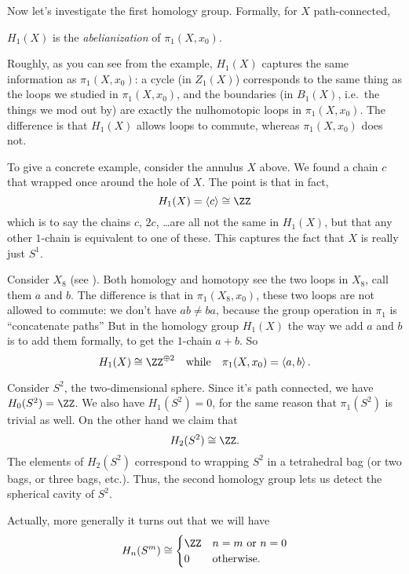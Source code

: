 Now let's investigate the first homology group.
Formally, for $X$ path-connected,
\begin{center}
	$H_1(X)$ is the \emph{abelianization} of $\pi_1(X, x_0)$.
\end{center}
Roughly, as you can see from the example, $H_1(X)$ captures the same information
as $\pi_1(X, x_0)$: a cycle (in $Z_1(X)$) corresponds to the same thing
as the loops we studied in $\pi_1(X, x_0)$,
and the boundaries (in $B_1(X)$, i.e.\ the things we mod out by)
are exactly the nulhomotopic loops in $\pi_1(X, x_0)$.
The difference is that $H_1(X)$ allows loops to commute, whereas $\pi_1(X, x_0)$ does not.
\begin{example}
	To give a concrete example, consider the annulus $X$ above.
	We found a chain $c$ that wrapped once around the hole of $X$.
	The point is that in fact,
	\[ H_1(X) = \left< c\right> \cong \ZZ \]
	which is to say the chains $c$, $2c$, \dots are all not the same in $H_1(X)$,
	but that any other $1$-chain is equivalent to one of these.
	This captures the fact that $X$ is really just $S^1$.
\end{example}
\begin{example}
	Consider $X_8$ (see ).
	Both homology and homotopy see the two loops in $X_8$, call them $a$ and $b$.
	The difference is that in $\pi_1(X_8, x_0)$,
	these two loops are not allowed to commute: we don't have $ab \neq ba$,
	because the group operation in $\pi_1$ is ``concatenate paths''
	But in the homology group $H_1(X)$ the way we add $a$ and $b$
	is to add them formally, to get the $1$-chain $a+b$.
	So \[ H_1(X) \cong \ZZ^{\oplus 2} \quad\text{while}\quad \pi_1(X, x_0) = \left< a,b\right>. \]
\end{example}

\begin{example}
	Consider $S^2$, the two-dimensional sphere.
	Since it's path connected, we have $H_0(S^2) = \ZZ$.
	We also have $H_1(S^2) = 0$, for the same reason that $\pi_1(S^2)$ is trivial as well.
	On the other hand we claim that \[ H_2(S^2) \cong \ZZ. \]
	The elements of $H_2(S^2)$ correspond to wrapping $S^2$ in a tetrahedral bag
	(or two bags, or three bags, etc.).
	Thus, the second homology group lets us detect the spherical cavity of $S^2$.
\end{example}
Actually, more generally it turns out that we will have
\[
	H_n(S^m) \cong 
	\begin{cases}
		\ZZ & n=m \text{ or } n=0 \\
		0 & \text{otherwise}.
	\end{cases}
\]

